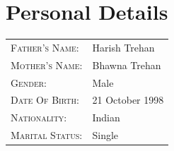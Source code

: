 \documentclass{my_cv}
\begin{document}
    \section{Personal Details}
      
      
    \begin{tabular}{ll}
    	\textsc{Father's Name:} & Harish Trehan \\
    	\textsc{Mother's Name:}       & Bhawna Trehan \\
    	\textsc{Gender:}         & Male \\
    	\textsc{Date Of Birth:}         & 21 October 1998 \\
    	\textsc{Nationality:}   & Indian \\
    	\textsc{Marital Status:} & Single \\
    \end{tabular}
	
\end{document}
